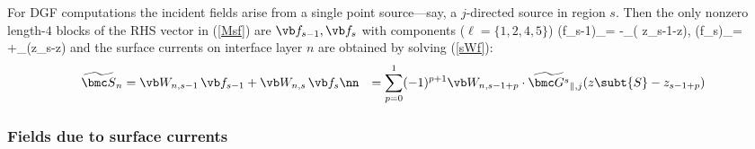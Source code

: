 \documentclass[letterpaper]{article}
\renewcommand{\wt}{\widetilde}
\begin{document}
For DGF computations the incident fields arise from
a single point source---say, a $j$-directed source
in region $s$.
Then the only nonzero length-$4$ blocks of the RHS vector in
(\ref{Msf}) are $\vb f_{s-1}, \vb f_s$ with components
($\ell=\{1,2,4,5\}$)
 { \Big(\vb f_{s-1}\Big)_\ell = -\wt {\mc G_{\ell j}^{s}}_{\parallel}( z_{s-1}-z),
   \qquad
   \Big(\vb f_{s}\Big)_\ell   = +\wt {\mc G_{\ell j}^s}_{\parallel}(z_s-z)
 }
and the surface currents on interface layer $n$ are obtained
by solving (\ref{sWf}):
\begin{align}
 \wt{\bmc S}_n 
&= \vb W_{n,s-1} \, \vb f_{s-1} + \vb W_{n,s} \, \vb f_{s}
\nn
&= \sum_{p=0}^1 (-1)^{p+1} \vb W_{n,s-1+p}
    \cdot
    \wt{\bmc G^s}_{\parallel, j}(z\subt{S}-z_{s-1+p})
\label{SWG}
\end{align}

\subsubsection*{Fields due to surface currents}
\end{document}
